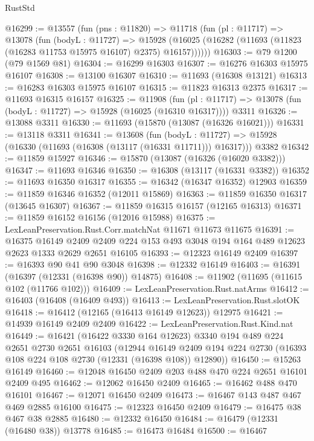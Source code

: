 \begin{lexlean}{RustStd}
\begin{coremodule}
@16299 := @13557
    (fun (pns : @11820) =>
    @11718
      (fun (pl : @11717) =>
      @13078
        (fun (bodyL : @11727) =>
        @15928 (@16025 (@16282 (@11693 (@11823 (@16283 @11753 @15975 @16107) @2375) @16157))))))
@16303 := @79 @1200 (@79 @1569 @81)
@16304 := @16299 @16303
@16307 := @16276 @16303 @15975 @16107
@16308 := @13100 @16307
@16310 := @11693 (@16308 @13121)
@16313 := @16283 @16303 @15975 @16107
@16315 := @11823 @16313 @2375
@16317 := @11693 @16315 @16157
@16325 := @11908
    (fun (pl : @11717) => @13078 (fun (bodyL : @11727) => @15928 (@16025 (@16310 @16317))))
    @3311
@16326 := @13088 @3311
@16330 := @11693 (@15870 (@13087 (@16326 @16021)))
@16331 := @13118 @3311
@16341 := @13608
    (fun (bodyL : @11727) => @15928 (@16330 (@11693 (@16308 (@13117 (@16331 @11711))) @16317)))
    @3382
@16342 := @11859 @15927
@16346 := @15870 (@13087 (@16326 (@16020 @3382)))
@16347 := @11693 @16346
@16350 := @16308 (@13117 (@16331 @3382))
@16352 := @11693 @16350 @16317
@16355 := @16342 (@16347 @16352) @12903
@16359 := @11859 @16346 @16352 (@12011 @15869)
@16363 := @11859 @16350 @16317 (@13645 @16307)
@16367 := @11859 @16315 @16157 (@12165 @16313)
@16371 := @11859 @16152 @16156 (@12016 @15988)
@16375 := LexLeanPreservation.Rust.Corr.matchNat @11671 @11673 @11675
@16391 := @16375
    @16149
    @2409
    @2409
    @224
    @153
    @493
    @3048
    @194
    @164
    @489
    @12623
    @2623
    @1333
    @2629
    @2651
    @16105
@16393 := @12323 @16149 @2409
@16397 := @16393 @90 @41 @90 @3048
@16398 := @12332 @16149
@16403 := @16391 (@16397 (@12331 (@16398 @90)) @14875)
@16408 := @11902 (@11695 (@11615 @102 (@11766 @102)))
@16409 := LexLeanPreservation.Rust.natArms
@16412 := @16403 (@16408 (@16409 @493))
@16413 := LexLeanPreservation.Rust.slotOK
@16418 := @16412 (@12165 (@16413 @16149 @12623)) @12975
@16421 := @14939 @16149 @2409 @2409
@16422 := LexLeanPreservation.Rust.Kind.nat
@16449 := @16421
    (@16422 @3330 @164 @12623)
    @3340
    @194
    @489
    @224
    @2651
    @2730
    @2651
    @16103
    (@12944
      @16149
      @2409
      @194
      @224
      @2730
      (@16393 @108 @224 @108 @2730 (@12331 (@16398 @108)) @12890))
@16450 := @15263 @16149
@16460 := @12048 @16450 @2409 @203 @488 @470 @224 @2651 @16101 @2409 @495
@16462 := @12062 @16450 @2409
@16465 := @16462 @488 @470 @16101
@16467 := @12071 @16450 @2409
@16473 := @16467 @143 @487 @467 @469 @2885 @16100
@16475 := @12323 @16450 @2409
@16479 := @16475 @38 @467 @38 @2885
@16480 := @12332 @16450
@16484 := @16479 (@12331 (@16480 @38)) @13778
@16485 := @16473 @16484
@16500 := @16467

\end{coremodule}
\end{lexlean}
